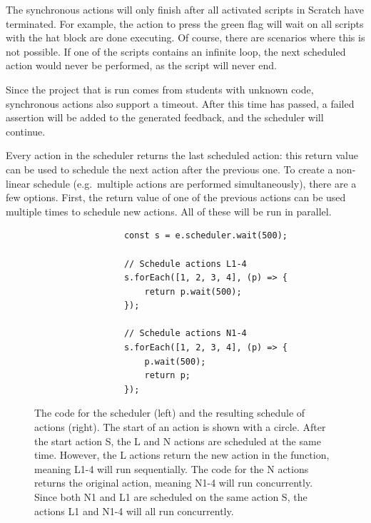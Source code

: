 \documentclass[../main]{subfiles}
\begin{document}
The synchronous actions will only finish after all activated scripts in Scratch have terminated.
For example, the action to press the green flag will wait on all scripts with the hat block  are done executing.
Of course, there are scenarios where this is not possible.
If one of the scripts contains an infinite loop, the next scheduled action would never be performed, as the script will never end.

Since the project that is run comes from students with unknown code, synchronous actions also support a timeout.
After this time has passed, a failed assertion will be added to the generated feedback, and the scheduler will continue.

Every action in the scheduler returns the last scheduled action: this return value can be used to schedule the next action after the previous one.
To create a non-linear schedule (e.g.\ multiple actions are performed simultaneously), there are a few options.
First, the return value of one of the previous actions can be used multiple times to schedule new actions.
All of these will be run in parallel.

\begin{figure}
    \begin{subfigure}{0.49\linewidth}
        \centering
        \begin{verbatim}
            const s = e.scheduler.wait(500);

            // Schedule actions L1-4
            s.forEach([1, 2, 3, 4], (p) => {
                return p.wait(500);
            });

            // Schedule actions N1-4
            s.forEach([1, 2, 3, 4], (p) => {
                p.wait(500);
                return p;
            });
        \end{verbatim}
    \end{subfigure}
    \begin{subfigure}{0.49\linewidth}
        \centering
        
    \end{subfigure}
    \caption{
        The code for the scheduler (left) and the resulting schedule of actions (right).
        The start of an action is shown with a circle.
        After the start action S, the L and N actions are scheduled at the same time.
        However, the L actions return the new action in the function, meaning L1-4 will run sequentially.
        The code for the N actions returns the original action, meaning N1-4 will run concurrently.
        Since both N1 and L1 are scheduled on the same action S, the actions L1 and N1-4 will all run concurrently.
    }
    \label{fig:itch-scheduler-schedule}
\end{figure}
\end{document}
